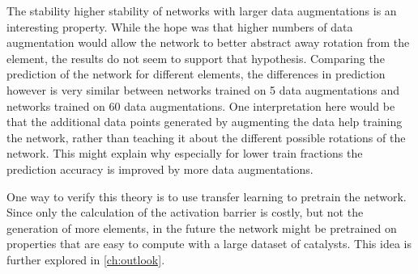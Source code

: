 The stability higher stability of networks with larger data augmentations is an interesting property.
While the hope was that higher numbers of data augmentation would allow the network to better abstract away rotation from the
element, the results do not seem to support that hypothesis.
Comparing the prediction of the network for different elements, the differences in prediction however is
very similar between networks trained on 5 data augmentations and networks trained on 60 data augmentations.
One interpretation here would be that the additional data points generated by augmenting the data help training the network,
rather than teaching it about the different possible rotations of the network.
This might explain why especially for lower train fractions the prediction accuracy is improved by more data augmentations.

One way to verify this theory is to use transfer learning to pretrain the network.
Since only the calculation of the activation barrier is costly, but not the generation of more elements,
in the future the network might be pretrained on properties that are easy to compute with a large dataset of catalysts.
This idea is further explored in \ref{ch:outlook}.

